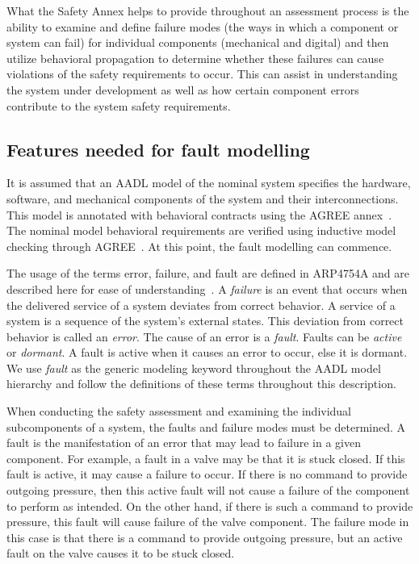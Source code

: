 What the Safety Annex helps to provide throughout an assessment process is the ability to examine and define failure modes (the ways in which a component or system can fail) for individual components (mechanical and digital) and then utilize behavioral propagation to determine whether these failures can cause violations of the safety requirements to occur. This can assist in understanding the system under development as well as how certain component errors contribute to the system safety requirements. 

\subsection{Features needed for fault modelling}
It is assumed that an AADL model of the nominal system specifies the hardware, software, and mechanical components of the system and their interconnections. This model is annotated with behavioral contracts using the AGREE annex~\cite{NFM2012:CoGaMiWhLaLu}. The nominal model behavioral requirements are verified using inductive model checking through AGREE~\cite{2017arXiv171201222G}. At this point, the fault modelling can commence. 

The usage of the terms error, failure, and fault are defined in ARP4754A and are described here for ease of understanding~\cite{SAE:ARP4754A}. A \textit{failure} is an event that occurs when the delivered service of a system deviates from correct behavior. A service of a system is a sequence of the system's external states. This deviation from correct behavior is called an \textit{error}. The cause of an error is a \textit{fault}. Faults can be \textit{active} or \textit{dormant}. A fault is active when it causes an error to occur, else it is dormant. We use {\em fault} as the generic modeling keyword throughout the AADL model hierarchy and follow the definitions of these terms throughout this description. 

When conducting the safety assessment and examining the individual subcomponents of a system, the faults and failure modes must be determined. A fault is the manifestation of an error that may lead to failure in a given component. For example, a fault in a valve may be that it is stuck closed. If this fault is active, it may cause a failure to occur. If there is no command to provide outgoing pressure, then this active fault will not cause a failure of the component to perform as intended. On the other hand, if there is such a command to provide pressure, this fault will cause failure of the valve component. The failure mode in this case is that there is a command to provide outgoing pressure, but an active fault on the valve causes it to be stuck closed. 

